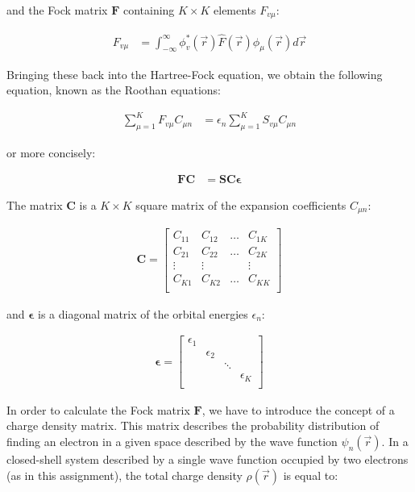 \documentclass[10pt, oneside, letterpaper]{article}
\begin{document}
and the Fock matrix $\bm{F}$ containing $K \times K$ elements $F_{v\mu}$:

\begin{align*}
F_{v\mu} &= \int_{-\infty}^{\infty} \phi_v^\ast(\vec{r}) \hat{F}(\vec{r}) \phi_\mu(\vec{r})d\vec{r}
\end{align*}

Bringing these back into the Hartree-Fock equation, we obtain the following equation, known as the Roothan equations:

\begin{align*}
\sum_{\mu = 1}^K F_{v\mu} C_{\mu n} &= \epsilon_n\sum_{\mu = 1}^K S_{v\mu} C_{\mu n}
\end{align*}

or more concisely:

\begin{align*}
\bm{F}\bm{C} &= \bm{S}\bm{C}\bm{\epsilon}
\end{align*}

The matrix $\bm{C}$ is a $K \times K$ square matrix of the expansion coefficients $C_{\mu n}$:

\begin{align*}
\bm{C} =
\begin{bmatrix}
 C_{11} & C_{12} & \hdots & C_{1K}\\
 C_{21} & C_{22} & \hdots & C_{2K}\\
 \vdots & \vdots &        & \vdots \\
 C_{K1} & C_{K2} & \hdots & C_{KK}\\
\end{bmatrix}
\end{align*}

and $\bm{\epsilon}$ is a diagonal matrix of the orbital energies $\epsilon_n$:

\begin{align*}
\bm{\epsilon} =
\begin{bmatrix}
 \epsilon_1 &            &        & \\
            & \epsilon_2 &        & \\
            &            & \ddots & \\
            &            &        & \epsilon_K\\
\end{bmatrix}
\end{align*}

In order to calculate the Fock matrix $\bm{F}$, we have to introduce the concept of a charge density matrix. This matrix describes the probability distribution of finding an electron in a given space described by the wave function $\psi_n(\vec{r})$. In a closed-shell system described by a single wave function occupied by two electrons (as in this assignment), the total charge density $\rho(\vec{r})$ is equal to:
\end{document}
